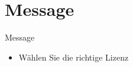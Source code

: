 
\section{Message}

\begin{frame}{Message}
	\begin{itemize}
		\item Wählen Sie die richtige Lizenz
	\end{itemize}
\end{frame}
